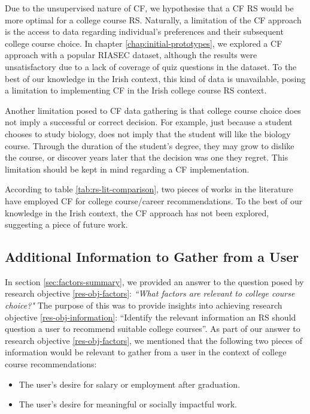 Due to the unsupervised nature of CF, we hypothesise that a CF RS would be more optimal for a college 
course RS. Naturally, a limitation of the CF approach is the access to data regarding individual's preferences and their subsequent college course choice.
In chapter \ref{chap:initial-prototypes}, we explored a CF approach with a popular RIASEC dataset,
although the results were unsatisfactory due to a lack of coverage of quiz questions in the dataset.
To the best of our knowledge in the Irish context, this kind of data is unavailable,
posing a limitation to implementing CF in the Irish college course RS context.

Another limitation posed to CF data gathering is that college course choice does not imply a successful 
or correct decision. For example,
just because a student chooses to study biology, does not imply that the student will like the biology course.
Through the duration of the student's degree, they may grow to dislike the course, 
or discover years later that the decision was one they regret.
This limitation should be kept in mind regarding a CF implementation.

According to table \ref{tab:rs-lit-comparison}, two pieces of works in the literature have employed 
CF for college course/career recommendations. 
To the best of our knowledge in the Irish context, the CF approach has not been explored,
suggesting a piece of future work.

\subsection{Additional Information to Gather from a User}
\label{sec:add-info-concl}

In section \ref{sec:factors-summary}, we provided an answer to the question posed by research objective \ref{res-obj-factors}:
\emph{``What factors are relevant to college course choice?"}
The purpose of this was to provide insights into achieving research objective \ref{res-obj-information}:
``Identify the relevant information an RS should question a user to recommend suitable college courses''.
As part of our answer to research objective \ref{res-obj-factors},
we mentioned that the following two pieces of information would be relevant to gather from 
a user in the context of college course recommendations:

\begin{itemize}
    \item The user's desire for salary or employment after graduation.
    \item The user's desire for meaningful or socially impactful work.
\end{itemize}

